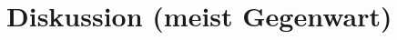 %
%
\glsresetall
\let\raggedsection\centering
\chapter{Diskussion (meist Gegenwart)}
\let\raggedsection\raggedright 

